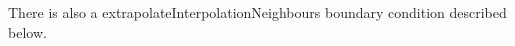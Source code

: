 There is also a {\ff extrapolateInterpolationNeighbours} boundary condition described below.








